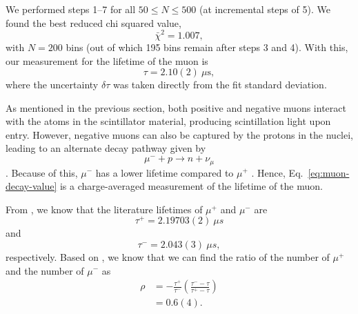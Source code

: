 \documentclass{../paper}
\begin{document}
We performed steps 1--7 for all $50 \leq N \leq 500$ (at incremental steps of 5). We found the best reduced chi squared value,
\begin{equation}
  \bar\chi^2 = 1.007,
\end{equation}
with $N=200$ bins (out of which 195 bins remain after steps 3 and 4). With this, our measurement for the lifetime of the muon is
\begin{equation}\label{eq:muon-decay-value}
  \tau = 2.10(2) \ \mu\text{s},
\end{equation}
where the uncertainty $\delta\tau$ was taken directly from the fit standard deviation.

As mentioned in the previous section, both positive and negative muons interact with the atoms in the scintillator material, producing scintillation light upon entry. However, negative muons can also be captured by the protons in the nuclei, leading to an alternate decay pathway given by 
\begin{equation}
  \mu^- + p \to n + \nu_\mu
\end{equation}
\cite{TeachSpinManual}. Because of this, $\mu^-$ has a lower lifetime compared to $\mu^+$ \cite{TeachSpinManual}. Hence, Eq.~\eqref{eq:muon-decay-value} is a charge-averaged measurement of the lifetime of the muon.

From \cite{TeachSpinManual}, we know that the literature lifetimes of $\mu^+$ and $\mu^-$ are
\begin{equation}\label{eq:tau+}
  \tau^+ = 2.19703(2) \ \mu s
\end{equation}
and
\begin{equation}\label{eq:tau-}
  \tau^- = 2.043(3) \ \mu s,
\end{equation}
respectively. Based on \cite{TeachSpinManual}, we know that we can find the ratio of the number of $\mu^+$ and the number of $\mu^-$ as
\begin{align}
  \rho
  &= -\frac{\tau^+}{\tau^-} \left(\frac{\tau^- - \tau}{\tau^+ - \tau}\right) \\
  &= 0.6(4). \label{eq:ratio}
\end{align}
\end{document}
